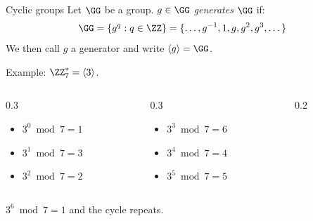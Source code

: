 \begin{frame}{Cyclic groups}
  Let $\GG$ be a group.
  $g \in \GG$ \emph{generates} $\GG$ if:
  \[
    \GG = \{g^q:q\in\ZZ\} = \{\dots, g^{-1}, 1, g, g^2, g^3, \dots\}
  \]
  \pause
  We then call $g$ a generator and write $\langle g\rangle = \GG$.

  \vspace*{0.5em}

  \pause
  Example: $\ZZ_7^* = \langle 3\rangle$.
  \pause
  \begin{columns}[T]
    \begin{column}{0.3\textwidth}
      \begin{itemize}
        \item $3^0 \bmod{7} = 1$
        \item $3^1 \bmod{7} = 3$
        \item $3^2 \bmod{7} = 2$
      \end{itemize}
    \end{column}
    \begin{column}{0.3\textwidth}
      \begin{itemize}
        \item $3^3 \bmod{7} = 6$
        \item $3^4 \bmod{7} = 4$
        \item $3^5 \bmod{7} = 5$
      \end{itemize}
    \end{column}
    \begin{column}{0.2\textwidth}
    \end{column}
  \end{columns}

  \vspace*{0.5em}

  \pause
  $3^6 \bmod 7 = 1$ and the cycle repeats.

\end{frame}

